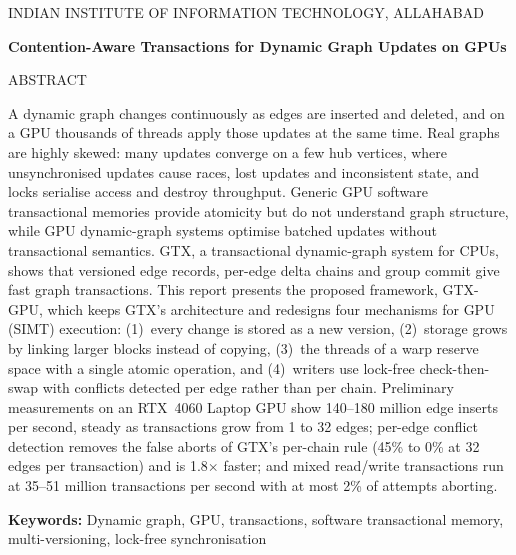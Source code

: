 \documentclass[11pt,a4paper,oneside]{report}
\newcommand{\ttitle}{Contention-Aware Transactions for Dynamic Graph Updates on GPUs}
\newcommand{\sys}{GTX-GPU}
\begin{document}
\pagestyle{front}
\thispagestyle{front}
\begin{center}
\vspace*{0.5cm}
{\normalsize INDIAN INSTITUTE OF INFORMATION TECHNOLOGY, ALLAHABAD\par}
\vspace{0.3cm}
{\large\bfseries \ttitle\par}
\vspace{0.3cm}
{\large ABSTRACT\par}
\end{center}
A dynamic graph changes continuously as edges are inserted and deleted, and on a GPU thousands of threads apply those
updates at the same time. Real graphs are highly skewed: many updates converge on a few hub vertices, where
unsynchronised updates cause races, lost updates and inconsistent state, and locks serialise access and destroy
throughput. Generic GPU software transactional memories provide atomicity but do not understand graph structure, while
GPU dynamic-graph systems optimise batched updates without transactional semantics. GTX, a transactional dynamic-graph
system for CPUs, shows that versioned edge records, per-edge delta chains and group commit give fast graph
transactions. This report presents the proposed framework, \sys{}, which keeps GTX's architecture and redesigns four
mechanisms for GPU (SIMT) execution: (1)~every change is stored as a new version, (2)~storage grows by linking larger
blocks instead of copying, (3)~the threads of a warp reserve space with a single atomic operation, and (4)~writers use
lock-free check-then-swap with conflicts detected per edge rather than per chain. Preliminary measurements on an
RTX~4060 Laptop GPU show 140--180 million edge inserts per second, steady as transactions grow from 1 to 32 edges;
per-edge conflict detection removes the false aborts of GTX's per-chain rule (45\% to 0\% at 32 edges per transaction)
and is 1.8$\times$ faster; and mixed read/write transactions run at 35--51 million transactions per second with at most
2\% of attempts aborting.

\vspace{0.4cm}
\textbf{Keywords:} Dynamic graph, GPU, transactions, software transactional memory, multi-versioning, lock-free
synchronisation
\clearpage
\end{document}
